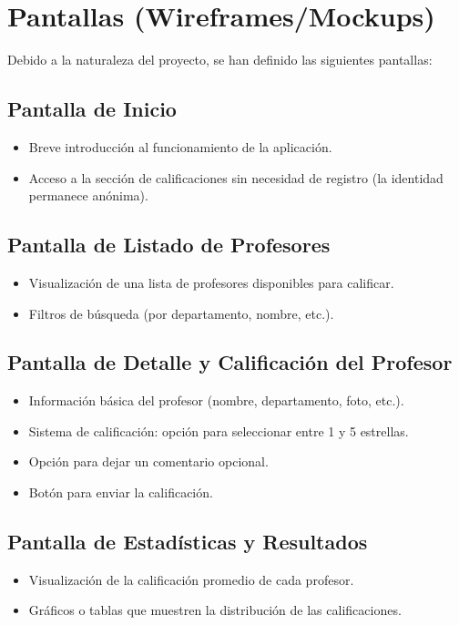 \documentclass[11pt]{article}
\begin{document}
\newpage
\section{Pantallas (Wireframes/Mockups)}

Debido a la naturaleza del proyecto, se han definido las siguientes pantallas:

\subsection{Pantalla de Inicio}
\begin{itemize}
    \item Breve introducción al funcionamiento de la aplicación.
    \item Acceso a la sección de calificaciones sin necesidad de registro (la identidad permanece anónima).
\end{itemize}

\subsection{Pantalla de Listado de Profesores}
\begin{itemize}
    \item Visualización de una lista de profesores disponibles para calificar.
    \item Filtros de búsqueda (por departamento, nombre, etc.).
\end{itemize}

\subsection{Pantalla de Detalle y Calificación del Profesor}
\begin{itemize}
    \item Información básica del profesor (nombre, departamento, foto, etc.).
    \item Sistema de calificación: opción para seleccionar entre 1 y 5 estrellas.
    \item Opción para dejar un comentario opcional.
    \item Botón para enviar la calificación.
\end{itemize}

\subsection{Pantalla de Estadísticas y Resultados}
\begin{itemize}
    \item Visualización de la calificación promedio de cada profesor.
    \item Gráficos o tablas que muestren la distribución de las calificaciones.
\end{itemize}
\end{document}
